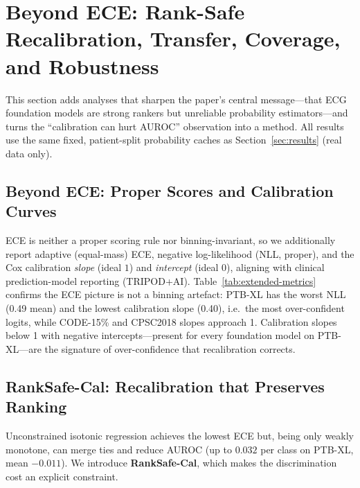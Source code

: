 \section{Beyond ECE: Rank-Safe Recalibration, Transfer, Coverage, and Robustness}
\label{sec:extended}
\sloppy

This section adds analyses that sharpen the paper's central message---that ECG foundation
models are strong rankers but unreliable probability estimators---and turns the
``calibration can hurt AUROC'' observation into a method. All results use the same fixed,
patient-split probability caches as Section~\ref{sec:results} (real data only).

\subsection{Beyond ECE: Proper Scores and Calibration Curves}
\label{sec:extended-metrics}

ECE is neither a proper scoring rule nor binning-invariant, so we additionally report
adaptive (equal-mass) ECE, negative log-likelihood (NLL, proper), and the Cox calibration
\emph{slope} (ideal $1$) and \emph{intercept} (ideal $0$), aligning with clinical
prediction-model reporting (TRIPOD+AI). Table~\ref{tab:extended-metrics} confirms the ECE
picture is not a binning artefact: PTB-XL has the worst NLL (0.49 mean) and the lowest
calibration slope (0.40), i.e.\ the most over-confident logits, while CODE-15\% and CPSC2018
slopes approach 1. Calibration slopes below 1 with negative intercepts---present for every
foundation model on PTB-XL---are the signature of over-confidence that recalibration
corrects.



\subsection{RankSafe-Cal: Recalibration that Preserves Ranking}
\label{sec:ranksafe}

Unconstrained isotonic regression achieves the lowest ECE but, being only weakly monotone,
can merge ties and reduce AUROC (up to $0.032$ per class on PTB-XL, mean $-0.011$). We
introduce \textbf{RankSafe-Cal}, which makes the discrimination cost an explicit constraint.

